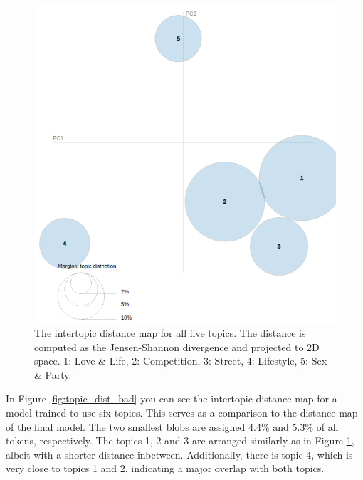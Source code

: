 \documentclass[conference]{IEEEtran}
\begin{document}
\begin{figure}[!t]
\includegraphics[width=\linewidth]{figures/topic_dist.png}
\vspace*{-8mm}
\caption{The intertopic distance map for all five topics. The distance is computed as the Jensen-Shannon divergence and projected to 2D space. 1: Love \& Life, 2: Competition, 3: Street, 4: Lifestyle, 5: Sex \& Party.}
\label{fig:topic_dist}
\end{figure}

In Figure \ref{fig:topic_dist_bad} you can see the intertopic distance map for a model trained to use six topics. This serves as a comparison to the distance map of the final model. The two smallest blobs are assigned 4.4\% and 5.3\% of all tokens, respectively. The topics 1, 2 and 3 are arranged similarly as in Figure \ref{fig:topic_dist}, albeit with a shorter distance inbetween. Additionally, there is topic 4, which is very close to topics 1 and 2, indicating a major overlap with both topics.
\end{document}
